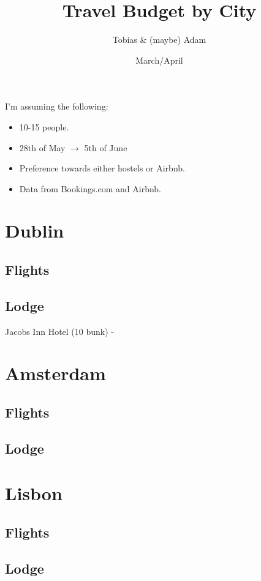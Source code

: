 \documentclass[12pt]{article}
\title{Travel Budget by City}
\author{Tobias \& (maybe) Adam}
\date{March/April}
\begin{document}
	\maketitle
	I'm assuming the following:
	\begin{itemize}
		\item 10-15 people.
		\item 28th of May $\rightarrow$ 5th of June
		\item Preference towards either hostels or Airbnb.
		\item Data from Bookings.com and Airbnb.
	\end{itemize}
	
	\section{Dublin}
	\subsection{Flights}
	
	\subsection{Lodge}
	Jacobs Inn Hotel (10 bunk) - 
	
	\section{Amsterdam}
	
	\subsection{Flights}
	
	\subsection{Lodge}
	
	\section{Lisbon}
	
	\subsection{Flights}
	
	\subsection{Lodge}
\end{document}
